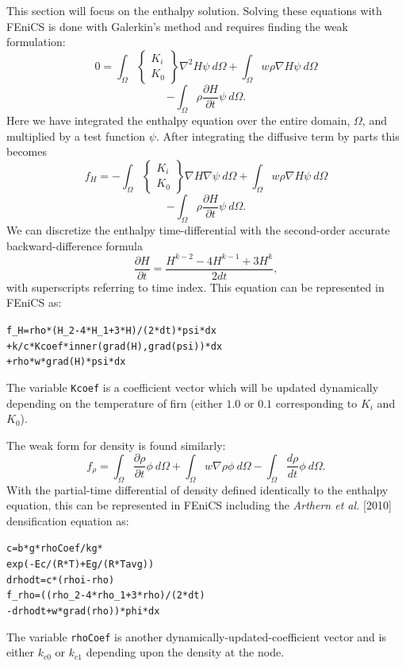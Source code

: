 \documentclass{article}%
\begin{document}
This section will focus on the enthalpy solution.  Solving these equations with FEniCS is done with Galerkin's method and requires finding the weak formulation:
  $$
    0 =
    \int_{\Omega} 
      \begin{Bmatrix}
        K_i\\
        K_0
      \end{Bmatrix}
      \nabla^2 H \psi\ d \Omega 
    + \int_{\Omega}w \rho \nabla H \psi\ d \Omega
  $$
  $$
    - \int_{\Omega} {\rho \frac{\partial H}{\partial t}} \psi\ d \Omega.
  $$
Here we have integrated the enthalpy equation over the entire domain, $\Omega$, and multiplied by a test function $\psi$.  After integrating the diffusive term by parts this becomes
  $$
    f_H =
    - \int_{\Omega} 
        \begin{Bmatrix}
          K_i\\
          K_0
        \end{Bmatrix}
        \nabla H \nabla \psi\ d \Omega 
    + \int_{\Omega}w \rho \nabla H \psi\ d \Omega
  $$
  $$
    - \int_{\Omega} {\rho \frac{\partial H}{\partial t}} \psi\ d \Omega.
  $$
We can discretize the enthalpy time-differential with the second-order accurate backward-difference formula
  $$\frac{\partial H}{\partial t} = \frac{H^{k-2} - 4H^{k-1} + 3H^k}{2dt},$$
with superscripts referring to time index.  This equation can be represented in FEniCS as:\par
\footnotesize
\begin{alltt}
f_H = rho*(H_2 - 4*H_1 + 3*H)/(2*dt)*psi*dx
      + k/c*Kcoef*inner(grad(H), grad(psi))*dx
      + rho*w*grad(H)*psi*dx
\end{alltt}
\normalsize
The variable \texttt{Kcoef} is a coefficient vector which will be updated dynamically depending on the temperature of firn (either $1.0$ or $0.1$ corresponding to $K_i$ and $K_0$).

The weak form for density is found similarly:
  $$
  f_{\rho} = 
    \int_{\Omega} \frac{\partial \rho}{\partial t}\phi\ d \Omega + 
    \int_{\Omega} w\nabla \rho \phi\ d \Omega -
    \int_{\Omega}\frac{d \rho}{dt}\phi\ d \Omega.
  $$
With the partial-time differential of density defined identically to the enthalpy equation, this can be represented in FEniCS including the \emph{Arthern et al.} [2010] densification equation as:\par
\footnotesize
\begin{alltt}
c      = b*g*rhoCoef/kg * 
         exp(-Ec/(R*T) + Eg/(R*Tavg))
drhodt = c*(rhoi - rho)
f_rho  = ((rho_2 - 4*rho_1 + 3*rho)/(2*dt) 
         - drhodt + w*grad(rho))*phi*dx 
\end{alltt}
\normalsize
The variable \texttt{rhoCoef} is another dynamically-updated-coefficient vector and is either $k_{c0}$ or $k_{c1}$ depending upon the density at the node.
\end{document}
